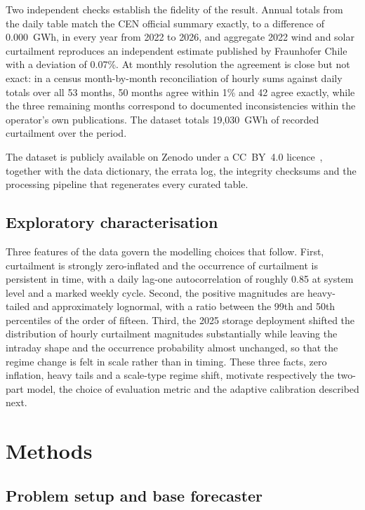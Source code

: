 \documentclass[preprint,3p,times]{elsarticle}
\begin{document}
Two independent checks establish the fidelity of the result. Annual totals from the daily table match the CEN official summary exactly, to a difference of 0.000~GWh, in every year from 2022 to 2026, and aggregate 2022 wind and solar curtailment reproduces an independent estimate published by Fraunhofer Chile with a deviation of 0.07\%. At monthly resolution the agreement is close but not exact: in a census month-by-month reconciliation of hourly sums against daily totals over all 53 months, 50 months agree within 1\% and 42 agree exactly, while the three remaining months correspond to documented inconsistencies within the operator's own publications. The dataset totals 19{,}030~GWh of recorded curtailment over the period.

The dataset is publicly available on Zenodo under a CC~BY~4.0 licence~\cite{dataset2026}, together with the data dictionary, the errata log, the integrity checksums and the processing pipeline that regenerates every curated table.

\subsection{Exploratory characterisation}

Three features of the data govern the modelling choices that follow. First, curtailment is strongly zero-inflated and the occurrence of curtailment is persistent in time, with a daily lag-one autocorrelation of roughly 0.85 at system level and a marked weekly cycle. Second, the positive magnitudes are heavy-tailed and approximately lognormal, with a ratio between the 99th and 50th percentiles of the order of fifteen. Third, the 2025 storage deployment shifted the distribution of hourly curtailment magnitudes substantially while leaving the intraday shape and the occurrence probability almost unchanged, so that the regime change is felt in scale rather than in timing. These three facts, zero inflation, heavy tails and a scale-type regime shift, motivate respectively the two-part model, the choice of evaluation metric and the adaptive calibration described next.

\section{Methods}
\label{sec:methods}

\subsection{Problem setup and base forecaster}
\end{document}
